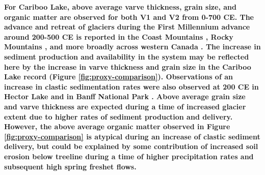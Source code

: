 \documentclass[Royal,times,doublespace,sageh]{sagej}
\begin{document}
\textbf{For Cariboo Lake, above average varve thickness, grain size, and
organic matter are observed for both V1 and V2 from 0-700 CE. The
advance and retreat of glaciers during the First Millennium advance
around 200-500 CE is reported in the Coast Mountains \citep{Allen2007},
Rocky Mountains
\citep{Luckman1995, Luckman1999, Dirszowsky1997a, Leonard1999}, and more
broadly across western Canada \citep{Solomina2016}. The increase in
sediment production and availability in the system may be reflected here
by the increase in varve thickness and grain size in the Cariboo Lake
record (Figure \ref{fig:proxy-comparison}). Observations of an increase
in clastic sedimentation rates were also observed at 200 CE in Hector
Lake \citep{Leonard1997} and in Banff National Park \citep{Leonard1999}.
Above average grain size and varve thickness are expected during a time
of increased glacier extent due to higher rates of sediment production
and delivery. However, the above average organic matter observed in
Figure \ref{fig:proxy-comparison} is atypical during an increase of
clastic sediment delivery, but could be explained by some contribution
of increased soil erosion below treeline during a time of higher
precipitation rates and subsequent high spring freshet flows.}
\end{document}

